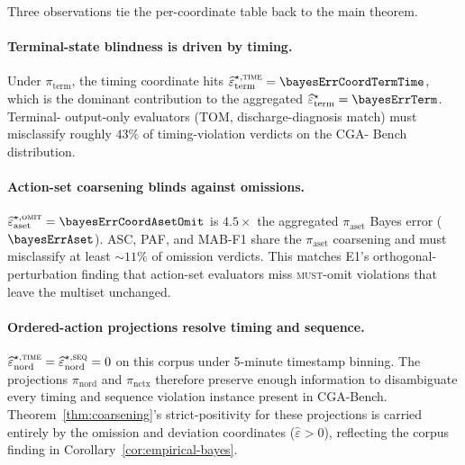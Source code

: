Three observations tie the per-coordinate table back to the main
theorem.

\paragraph{Terminal-state blindness is driven by timing.}
Under $\pi_{\mathrm{term}}$, the timing coordinate hits
$\widehat{\varepsilon}^{\star,\textsc{time}}_{\mathrm{term}}=\bayesErrCoordTermTime$,
which is the dominant contribution to the aggregated
$\widehat{\varepsilon}^{\star}_{\mathrm{term}}=\bayesErrTerm$. Terminal-
output-only evaluators (TOM, discharge-diagnosis match) must
misclassify roughly $43\%$ of timing-violation verdicts on the CGA-
Bench distribution.

\paragraph{Action-set coarsening blinds against omissions.}
$\widehat{\varepsilon}^{\star,\textsc{omit}}_{\mathrm{aset}}=\bayesErrCoordAsetOmit$
is $4.5\times$ the aggregated $\pi_{\mathrm{aset}}$ Bayes error
($\bayesErrAset$). ASC, PAF, and MAB-F1 share the $\pi_{\mathrm{aset}}$
coarsening and must misclassify at least $\sim 11\%$ of omission
verdicts. This matches E1's orthogonal-perturbation finding that
action-set evaluators miss \textsc{must}-omit violations that leave
the multiset unchanged.

\paragraph{Ordered-action projections resolve timing and sequence.}
$\widehat{\varepsilon}^{\star,\textsc{time}}_{\mathrm{nord}}=\widehat{\varepsilon}^{\star,\textsc{seq}}_{\mathrm{nord}}=0$
on this corpus under 5-minute timestamp binning. The projections
$\pi_{\mathrm{nord}}$ and $\pi_{\mathrm{nctx}}$ therefore preserve
enough information to disambiguate every timing and sequence
violation instance present in CGA-Bench. Theorem~\ref{thm:coarsening}'s
strict-positivity for these projections is carried entirely by the
omission and deviation coordinates ($\widehat{\varepsilon}>0$),
reflecting the corpus finding in Corollary~\ref{cor:empirical-bayes}.
